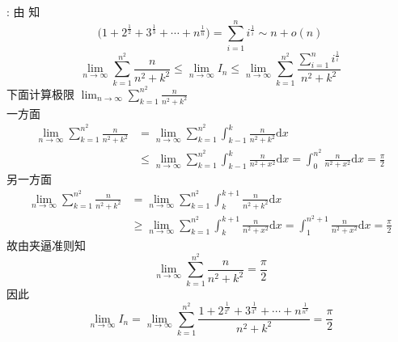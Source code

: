 \documentclass[color=green,titlestyle=hang]{elegantbook}%
\begin{document}
\begin{Solution}
:\; 由  知\begin{equation*}
\Big(1+2^{\frac{1}{2}}+3^{\frac{1}{3}}+\cdots+n^{\frac{1}{n}}\Big)=\sum_{i=1}^{n}i^{\frac{1}{i}}\sim n+o(n)
\end{equation*}
\begin{equation*}
\lim_{n\to\infty}\sum_{k=1}^{n^2}\frac{n}{n^2+k^2}\leqslant\lim_{n\to\infty}I_n\leqslant\lim_{n\to\infty}\sum_{k=1}^{n^2}\frac{\sum\limits_{i=1}^{n}i^{\frac{1}{i}}}{n^2+k^2}
\end{equation*}
下面计算极限 $\displaystyle \lim_{n\to\infty}\sum_{k=1}^{n^2}\frac{n}{n^2+k^2}$\\[1mm]
一方面\begin{align*}
\lim_{n\to\infty}\sum_{k=1}^{n^2}\frac{n}{n^2+k^2}&=\lim_{n\to\infty}\sum_{k=1}^{n^2}\int_{k-1}^k\frac{n}{n^2+k^2}\mathrm{d}x\\&\leqslant\lim_{n\to\infty}\sum_{k=1}^{n^2}\int_{k-1}^k\frac{n}{n^2+x^2}\mathrm{d}x=\int_0^{n^2}\frac{n}{n^2+x^2}\mathrm{d}x=\frac{\pi}{2}
\end{align*}
另一方面\begin{align*}
\lim_{n\to\infty}\sum_{k=1}^{n^2}\frac{n}{n^2+k^2}&=\lim_{n\to\infty}\sum_{k=1}^{n^2}\int_{k}^{k+1}\frac{n}{n^2+k^2}\mathrm{d}x\\&\geqslant\lim_{n\to\infty}\sum_{k=1}^{n^2}\int_{k}^{k+1}\frac{n}{n^2+x^2}\mathrm{d}x=\int_1^{n^2+1}\frac{n}{n^2+x^2}\mathrm{d}x=\frac{\pi}{2}
\end{align*}
故由夹逼准则知\begin{equation*}\lim_{n\to\infty}\sum_{k=1}^{n^2}\frac{n}{n^2+k^2}=\frac{\pi}{2}\end{equation*}
因此\begin{equation*}
\lim_{n\to\infty} I_n=\lim_{n\to\infty} \sum_{k=1}^{n^2}\frac{1+2^{\frac{1}{2^k}}+3^{\frac{1}{3^k}}+\cdots+n^{\frac{1}{n^k}}}{n^2+k^2}=\frac{\pi}{2}
\end{equation*}
\end{Solution}
\end{document}

